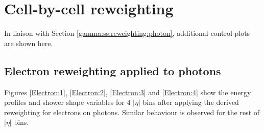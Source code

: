 \newpage
\chapter{Cell-by-cell reweighting}
In liaison with Section \ref{gamma:ss:reweighting:photon}, additional control plots are shown here.
\section{Electron reweighting applied to photons}
\label{Adx1:Electron}
Figures \ref{Electron:1}, \ref{Electron:2}, \ref{Electron:3} and \ref{Electron:4} show the energy profiles and shower shape variables for 4 $|\eta|$ bins after applying the derived reweighting for electrons on photons. Similar behaviour is observed for the rest of $|\eta|$ bins.  
\begin{figure}[ht]
    \centering
	 \\

\end{figure}
